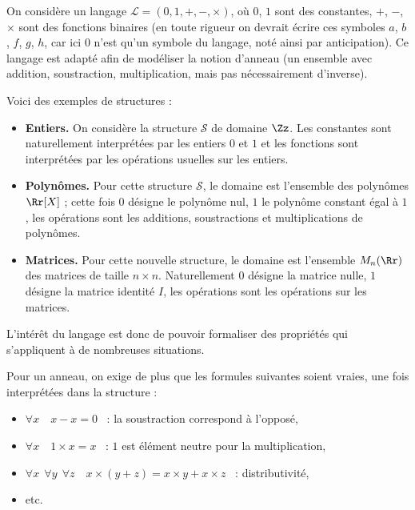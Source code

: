 \documentclass[11pt,class=report,crop=false]{standalone}
\begin{document}
On considère un langage $\mathcal{L} = (0,1,+,-,\times)$, où $0$, $1$ sont des constantes, $+$, $-$, $\times$ sont des fonctions binaires (en toute rigueur on devrait écrire ces symboles $a$, $b$, $f$, $g$, $h$, car ici $0$ n'est qu'un symbole du langage, noté ainsi par anticipation).
Ce langage est adapté afin de modéliser la notion d'anneau (un ensemble avec addition, soustraction, multiplication, mais pas nécessairement d'inverse).

Voici des exemples de structures :
\begin{itemize}
	\item \textbf{Entiers.} On considère la structure $\mathcal{S}$ de domaine $\Zz$. Les constantes sont naturellement interprétées par les entiers $0$ et $1$ et les fonctions  sont interprétées par les opérations usuelles sur les entiers.
	
	\item \textbf{Polynômes.} Pour cette structure $\mathcal{S}$, le domaine est l'ensemble des polynômes $\Rr[X]$ ; cette fois $0$ désigne le polynôme nul, $1$ le polynôme constant égal à $1$, les opérations sont les additions, soustractions et multiplications de polynômes.

	\item \textbf{Matrices.} Pour cette nouvelle structure, le domaine est l'ensemble $M_{n}(\Rr)$ des matrices de taille $n \times n$. Naturellement $0$ désigne la matrice nulle, $1$ désigne la matrice identité $I$, les opérations sont les opérations sur les matrices.
\end{itemize}

L'intérêt du langage est donc de pouvoir formaliser des propriétés qui s'appliquent à de nombreuses situations.

Pour un anneau, on exige de plus que les formules suivantes soient vraies, une fois interprétées dans la structure :
\begin{itemize}
	\item $\forall x \quad x-x = 0$ \ : la soustraction correspond à l'opposé,
	
	\item $\forall x \quad 1 \times x = x$ \ : $1$ est élément neutre pour la multiplication, 
	
	\item $\forall x \ \ \forall y \ \  \forall z \quad x \times (y+z) = x \times y + x \times z$ \ : distributivité,
	
	\item etc.
\end{itemize}
 
\end{document}
